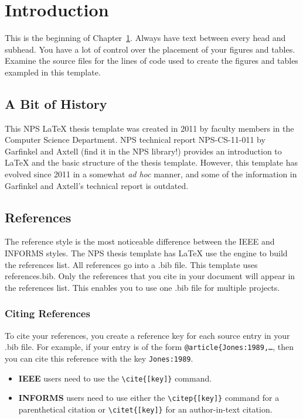 \chapter{Introduction}\label{ch:common}

This is the beginning of Chapter~\ref{ch:common}. 
Always have text between every head and subhead. You have a lot of control over the placement of your figures and tables. Examine the source files for the lines of code used to create the figures and tables exampled in this template. 

\section{A Bit of History}

This NPS \LaTeX{} thesis template was created in 2011 by faculty members in the Computer Science Department. NPS technical report NPS-CS-11-011 by Garfinkel and Axtell (find it in the NPS library!) provides an introduction to \LaTeX{} and the basic structure of the thesis template. However, this template has evolved since 2011 in a somewhat {\it ad hoc} manner, and some of the information in Garfinkel and Axtell's technical report is outdated.

\section{References}
The reference style is the most noticeable difference between the IEEE and INFORMS styles.
The NPS thesis template has \LaTeX{} use the \BibTeX{} engine to build the references list.
All references go into a .bib file.  This template uses references.bib.  Only the references that you cite in your document will appear in the references list.  This enables you to use one .bib file for multiple projects.

\subsection{Citing References}
To cite your references, you create a reference key for each source entry in your .bib file.  For example, if your \BibTeX{} entry is of the form {\tt @article\{Jones:1989,\dots}, then you can cite this reference with the key {\tt Jones:1989}.
\begin{itemize}
    \item \textbf{IEEE} users need to use the \verb|\cite{[key]}| command.
    \item \textbf{INFORMS} users need to use either the \verb|\citep{[key]}| command for a parenthetical citation or \verb|\citet{[key]}| for an author-in-text citation.
\end{itemize}


